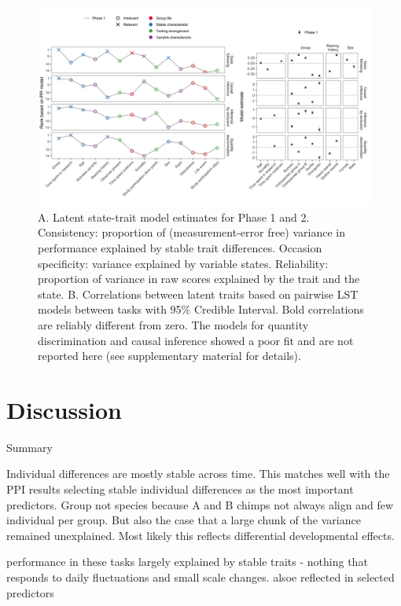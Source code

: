 \documentclass[
  man,floatsintext]{apa6}
\begin{document}
\begin{figure}

{\centering \includegraphics[width=1\linewidth]{./figures/ppi3} 

}

\caption{A. Latent state-trait model estimates for Phase 1 and 2. Consistency: proportion of (measurement-error free) variance in performance explained by stable trait differences. Occasion specificity: variance explained by variable states. Reliability: proportion of variance in raw scores explained by the trait and the state. B. Correlations between latent traits based on pairwise LST models between tasks with 95\% Credible Interval. Bold correlations are reliably different from zero. The models for quantity discrimination and causal inference showed a poor fit and are not reported here (see supplementary material for details).}\label{fig:ppiplot}
\end{figure}

\hypertarget{discussion}{%
\section{Discussion}\label{discussion}}

Summary

Individual differences are mostly stable across time. This matches well with the PPI results selecting stable individual differences as the most important predictors. Group not species because A and B chimps not always align and few individual per group. But also the case that a large chunk of the variance remained unexplained. Most likely this reflects differential developmental effects.

performance in these tasks largely explained by stable traits - nothing that responds to daily fluctuations and small scale changes. alsoe reflected in selected predictors
\end{document}
